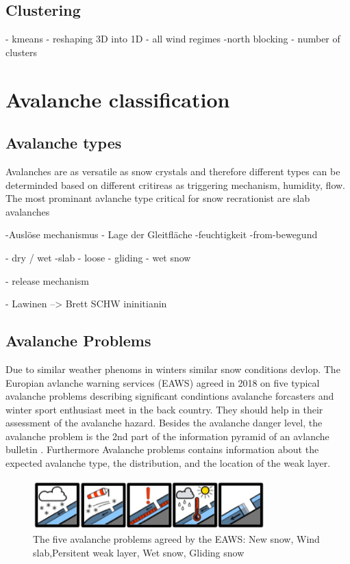 \subsection{Clustering}
- kmeans
- reshaping 3D into 1D
- all wind regimes
-north blocking
- number of clusters

\section{Avalanche classification} 

\subsection{Avalanche types}

Avalanches are as versatile as snow crystals and therefore different types can be determinded based on different critireas
as triggering mechanism, humidity, flow. The most prominant avlanche type critical for snow recrationist are slab avalanches


-Auslöse mechanismus
- Lage der Gleitfläche
-feuchtigkeit
-from-bewegund

- dry / wet
-slab - loose - gliding - wet snow

- release mechanism

- Lawinen --> Brett SCHW ininitianin



\subsection{Avalanche Problems}

Due to similar weather phenoms in winters similar snow conditions devlop. The Europian avlanche warning services (EAWS)
agreed in 2018 on five typical avalanche problems describing significant condintions avalanche forcasters and winter sport
enthusiast meet in the back country. They should help in their assessment of the avalanche hazard. Besides the avalanche danger level, the avalanche problem is the 2nd part of the information pyramid
of an avlanche bulletin \cite{mittererAusbildungshandbuchTirolerLawinenkommissionen2022}. Furthermore Avalanche problems
contains information about the expected avalanche type, the distribution, and the location of the weak layer. 

\begin{figure}[h]
    \centering
    \includegraphics[width=0.8\textwidth]{Figures/figures_methods/avaprobs.png}
    \caption{The five avalanche problems agreed by the EAWS: New snow, Wind slab,Persitent weak layer, Wet snow, Gliding snow}
    \label{fig:avaprobs}
\end{figure}

